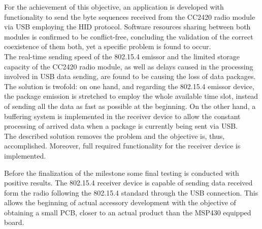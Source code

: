 \begin{enumerate}
			For the achievement of this objective, an application is developed with functionality to send the byte sequences received from the CC2420 radio module via USB employing the HID protocol. Software resources sharing between both modules is confirmed to be conflict-free, concluding the validation of the correct coexistence of them both, yet a specific problem is found to occur.\\

			The real-time sending speed of the 802.15.4 emissor and the limited storage capacity of the CC2420 radio module, as well as delays caused in the processing involved in USB data sending, are found to be causing the loss of data packages. The solution is twofold: on one hand, and regarding the 802.15.4 emissor device, the package emission is stretched to employ the whole available time slot, instead of sending all the data as fast as possible at the beginning. On the other hand, a buffering system is implemented in the receiver device to allow the constant processing of arrived data when a package is currently being sent via USB.\\

			The described solution removes the problem and the objective is, thus, accomplished. Moreover, full required functionality for the receiver device is implemented.\\

			\end{enumerate}
	
		Before the finalization of the milestone some final testing is conducted with positive results. The 802.15.4 receiver device is capable of sending data received form the radio following the 802.15.4 standard through the USB connection. This allows the beginning of actual accessory development with the objective of obtaining a small PCB, closer to an actual product than the MSP430 equipped board.\\


